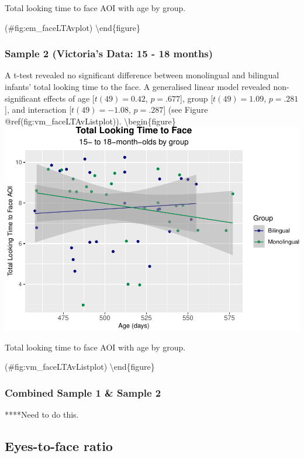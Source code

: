 \documentclass[english,man,floatsintext]{apa6}
\begin{document}
\caption{Total looking time to face AOI with age by group.}

(\#fig:em\_faceLTAvplot)
\textbackslash{}end\{figure\}

\hypertarget{sample-2-victorias-data-15---18-months-2}{%
\subsubsection{Sample 2 (Victoria's Data: 15 - 18 months)}\label{sample-2-victorias-data-15---18-months-2}}

A t-test revealed no significant difference between monolingual and bilingual infants' total looking time to the face. A generalised linear model revealed non-significant effects of age {[}\(t(49) = 0.42\), \(p = .677\){]}, group {[}\(t(49) = 1.09\), \(p = .281\){]}, and interaction {[}\(t(49) = -1.08\), \(p = .287\){]} (see Figure @ref(fig:vm\_faceLTAvListplot)).
\textbackslash{}begin\{figure\}
\includegraphics{Effects_of_early_language_experience_on_infants_files/figure-latex/vm_faceLTAvListplot-1}

\caption{Total looking time to face AOI with age by group.}

(\#fig:vm\_faceLTAvListplot)
\textbackslash{}end\{figure\}

\hypertarget{combined-sample-1-sample-2-2}{%
\subsubsection{Combined Sample 1 \& Sample 2}\label{combined-sample-1-sample-2-2}}

****Need to do this.

\hypertarget{eyes-to-face-ratio}{%
\subsection{Eyes-to-face ratio}\label{eyes-to-face-ratio}}
\end{document}
